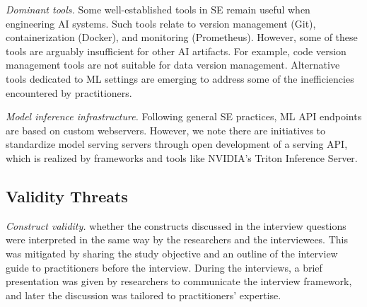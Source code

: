 \textit{Dominant tools.} Some well-established tools in SE remain useful when engineering AI systems. Such tools relate to version management (Git), containerization (Docker), and monitoring (Prometheus). However, some of these tools are arguably insufficient for other AI artifacts. For example, code version management tools are not suitable for data version management. Alternative tools dedicated to ML settings are emerging to address some of the inefficiencies encountered by practitioners. %



\textit{Model inference infrastructure.} Following general SE practices, ML API endpoints are based on custom webservers. However, we note there are initiatives to standardize model serving servers through open development of a serving API, which is realized by frameworks and tools like NVIDIA's Triton Inference Server\DIFaddbegin {}\DIFaddend .

\subsection{Validity Threats}

\textit{Construct validity.} \DIFdelbegin {}\DIFdelend \DIFaddbegin {}\DIFaddend whether the constructs discussed in the interview questions were interpreted in the same way by the researchers and the interviewees. This was mitigated by sharing the study objective and an outline of the interview guide to practitioners before the interview. During the interviews, a brief presentation was given by researchers to communicate the interview framework, and later the discussion was tailored to practitioners' expertise.


